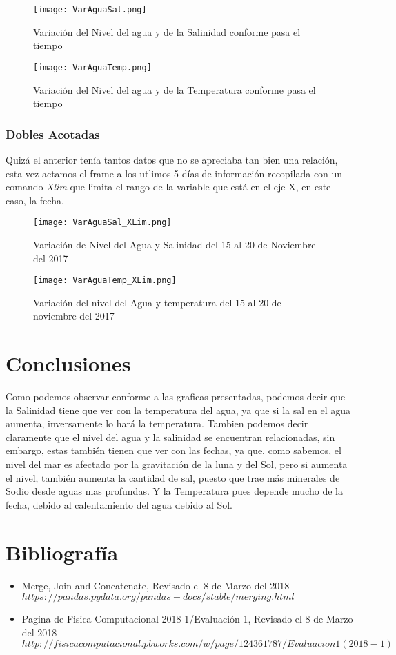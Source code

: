 \documentclass{article}
\begin{document}
\begin{figure}[H]
\texttt{[image: VarAguaSal.png]}
\centering
\caption{Variación del Nivel del agua y de la Salinidad conforme pasa el tiempo}
\end{figure}

\begin{figure}[H]
\texttt{[image: VarAguaTemp.png]}
\centering
\caption{Variación del Nivel del agua y de la Temperatura conforme pasa el tiempo}
\end{figure}

\subsubsection{Dobles Acotadas}
Quizá el anterior tenía tantos datos que no se apreciaba tan bien una relación, esta vez actamos el frame a los utlimos 5 días de información recopilada con un comando \textit{Xlim} que limita el rango de la variable que está en el eje X, en este caso, la fecha.

\begin{figure}[H]
\texttt{[image: VarAguaSal\_XLim.png]}
\centering
\caption{Variación de Nivel del Agua y Salinidad del 15 al 20 de Noviembre del 2017}
\end{figure}

\begin{figure}[H]
\texttt{[image: VarAguaTemp\_XLim.png]}
\centering
\caption{Variación del nivel del Agua y temperatura del 15 al 20 de noviembre del 2017}
\end{figure}

\section{Conclusiones}
Como podemos observar conforme a las graficas presentadas, podemos decir que la Salinidad tiene que ver con la temperatura del agua, ya que si la sal en el agua aumenta, inversamente lo hará la temperatura.
Tambien podemos decir claramente que el nivel del agua y la salinidad se encuentran relacionadas, sin embargo, estas también tienen que ver con las fechas, ya que, como sabemos, el nivel del mar es afectado por la gravitación de la luna y del Sol, pero si aumenta el nivel, también aumenta la cantidad de sal, puesto que trae más minerales de Sodio desde aguas mas profundas. Y la Temperatura pues depende mucho de la fecha, debido al calentamiento del agua debido al Sol.

\newpage

\section{Bibliografía}
\begin{itemize}
\item{Merge, Join and Concatenate, Revisado el 8 de Marzo del 2018} $https://pandas.pydata.org/pandas-docs/stable/merging.html$ 

\item{Pagina de Fisica Computacional 2018-1/Evaluación 1, Revisado el 8 de Marzo del 2018} 
$http://fisicacomputacional.pbworks.com/w/page/124361787/Evaluacion 1 (2018-1)$
\end{itemize}
\end{document}
